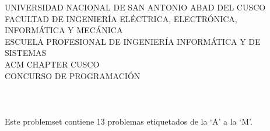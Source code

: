 \begin{center}
    \large
    UNIVERSIDAD NACIONAL DE SAN ANTONIO ABAD DEL CUSCO\\
    \vspace{0.3cm}
    FACULTAD DE INGENIERÍA ELÉCTRICA, ELECTRÓNICA, INFORMÁTICA Y MECÁNICA\\
    \vspace{0.3cm}
    ESCUELA PROFESIONAL DE INGENIERÍA INFORMÁTICA Y DE SISTEMAS\\
    \vspace{2cm}
    ACM CHAPTER CUSCO\\
    \vspace{2cm}
    \Large
    CONCURSO DE PROGRAMACIÓN\\
    \vspace{0.5cm}
    \Huge{\textbf{\cuscontestName}}\\
    \Large
    \vspace{0.5cm}
    \iftoggle{solution}{\textit{PROBLEMSET CON SOLUCIONES}}{\textit{PROBLEMSET}}
    \\
    \vspace{3cm}
    \large
    \cuscontestDate\\
    \vspace{3cm}
    Este problemset contiene 13 problemas etiquetados de la `A' a la `M'.
\end{center}

